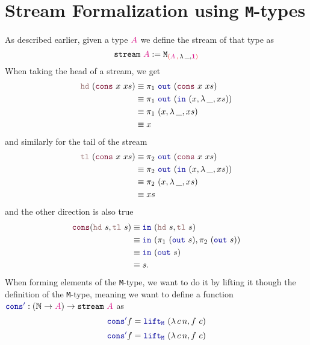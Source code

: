 \documentclass[twoside,11pt,openright]{report}
\theoremstyle{plain} %
\theoremstyle{definition}
\theoremstyle{remark}
\newcommand*{\type}[1]{\textcolor{magenta!90!black}{#1}}
\newcommand*{\containerpair}[2]{\textcolor{red}{(}#1\,\textcolor{red}{,}\,#2\textcolor{red}{)}}
\newcommand*{\unit}{\type{\textbf{1}}}
\newcommand*{\function}[1]{\textcolor{blue!60!black}{\ensuremath{\mathtt{#1}}}}
\newcommand*{\constructor}[1]{\textcolor{purple!60!black}{\ensuremath{\mathtt{#1}}}}
\newcommand*{\destructor}[1]{\textcolor{pink!60!black}{\ensuremath{\mathtt{#1}}}}
\newcommand*{\typeformer}[1]{\ensuremath{\mathtt{#1}}}
\begin{document}
\section{Stream Formalization using \texttt{M}-types}
As described earlier, given a type \(\type{A}\) we define the stream of that type as
\begin{equation}
  \typeformer{stream}~\type{A} := \typeformer{M}_{\containerpair{\type{A}}{\lambda\,\_,\unit}}
\end{equation}
When taking the head of a stream, we get
\begin{align}
  \destructor{hd}~(\constructor{cons}~x~xs) &\equiv \pi_1~\function{out}~(\constructor{cons}~x~xs) \\
                                       &\equiv \pi_1~\function{out}~(\function{in}~(x , \lambda\,\_,xs)) \\
                                       &\equiv \pi_1~(x , \lambda\,\_,xs) \\
                                       &\equiv x
\end{align}
and similarly for the tail of the stream
\begin{align}
  \destructor{tl}~(\constructor{cons}~x~xs) &\equiv \pi_2~\function{out}~(\constructor{cons}~x~xs) \\
                                       &\equiv \pi_2~\function{out}~(\function{in}~(x , \lambda\,\_,xs)) \\
                                       &\equiv \pi_2~(x , \lambda\,\_,xs) \\
                                       &\equiv xs
\end{align}
and the other direction is also true
\begin{align}
  \constructor{cons}(\destructor{hd}~s , \destructor{tl}~s) &\equiv \function{in}~(\destructor{hd}~s , \destructor{tl}~s) \\
                                                     &\equiv \function{in}~(\pi_1~(\function{out}~s) , \pi_2~(\function{out}~s)) \\
                                                     &\equiv \function{in}~(\function{out}~s) \\
                                                     &\equiv s.
\end{align}
When forming elements of the \texttt{M}-type, we want to do it by lifting it though the definition of the \texttt{M}-type, meaning we want to define a function \(\function{cons'} : (\mathbb{N} \rightarrow \type{A}) \rightarrow \typeformer{stream}~\type{A}\) as
\begin{equation}
  \function{cons'} f = \function{lift_M}~(\lambda\,c\,n, f~c)
\end{equation}
\begin{equation}
  \function{cons'} f = \function{lift_M}~(\lambda\,c\,n, f~c)
\end{equation}
\end{document}
